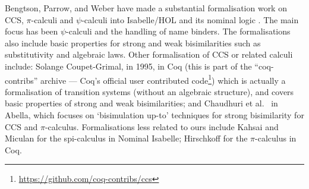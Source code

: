 Bengtson,  Parrow, and  Weber
have made a substantial formalisation work 
on CCS, $\pi$-calculi and $\psi$-calculi 
into Isabelle/HOL and its
nominal logic
 \cite{bengtson2010formalising,bengtson2007completeness,DBLP:journals/jar/BengtsonPW16}. The main focus has been 
 $\psi$-calculi and the handling  of name binders.
The formalisations also  include
 basic properties for strong and weak bisimilarities  such as
 substitutivity and 
 algebraic laws.
%
Other formalisation of CCS or related calculi include: 
 Solange
Coupet-Grimal, in 
1995, in Coq (this  is part of the
``coq-contribs'' archive --- Coq's official user contributed
code\footnote{\url{https://github.com/coq-contribs/ccs}})  which is
actually
a formalisation of transition systems (without an algebraic structure),
and covers  basic properties of strong and weak bisimilarities;
and  Chaudhuri et
al.\   \cite{chaudhuri2014formalization}  in Abella, which
 focuses on `bisimulation up-to' techniques for strong bisimilarity 
for  CCS and $\pi$-calculus. Formalisations less related to ours
include
 Kahsai and Miculan  \cite{...} for the spi-calculus    in
Nominal Isabelle; 
  Hirschkoff  \cite{...} for the $\pi$-calculus    in Coq. 






